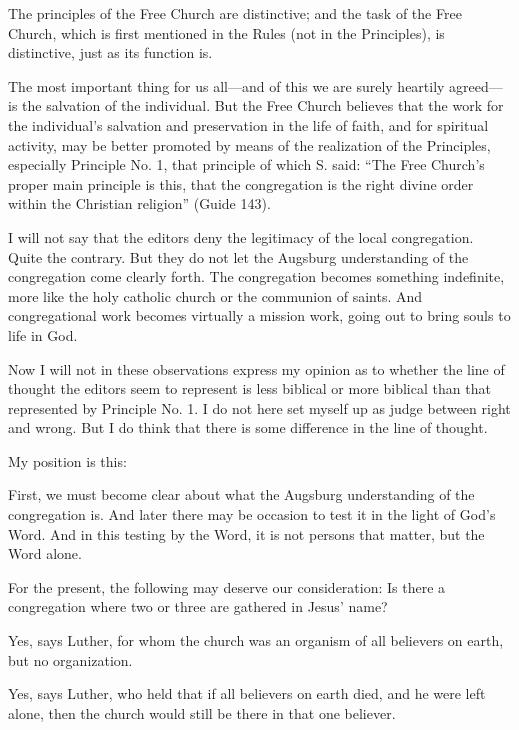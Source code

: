 The principles of the Free Church are distinctive; and the task of the Free Church, which is first mentioned in the Rules (not in the Principles), is distinctive, just as its function is.

The most important thing for us all—and of this we are surely heartily agreed—is the salvation of the individual. But the Free Church believes that the work for the individual’s salvation and preservation in the life of faith, and for spiritual activity, may be better promoted by means of the realization of the Principles, especially Principle No. 1, that principle of which S. said: “The Free Church’s proper main principle is this, that the congregation is the right divine order within the Christian religion” (Guide 143).

I will not say that the editors deny the legitimacy of the local congregation. Quite the contrary. But they do not let the Augsburg understanding of the congregation come clearly forth. The congregation becomes something indefinite, more like the holy catholic church or the communion of saints. And congregational work becomes virtually a mission work, going out to bring souls to life in God.

Now I will not in these observations express my opinion as to whether the line of thought the editors seem to represent is less biblical or more biblical than that represented by Principle No. 1. I do not here set myself up as judge between right and wrong. But I do think that there is some difference in the line of thought.

My position is this:

First, we must become clear about what the Augsburg understanding of the congregation is. And later there may be occasion to test it in the light of God’s Word. And in this testing by the Word, it is not persons that matter, but the Word alone.

For the present, the following may deserve our consideration:
Is there a congregation where two or three are gathered in Jesus’ name?

Yes, says Luther, for whom the church was an organism of all believers on earth, but no organization.

Yes, says Luther, who held that if all believers on earth died, and he were left alone, then the church would still be there in that one believer.

